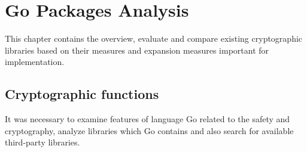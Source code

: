 \documentclass[
  digital, %
  notable,   %
  lof,     %
  lot,     %
]{fithesis3}
\begin{document}

\nocite{chisnall2012go}
\nocite{balbaert_2012}
\nocite{summerfield_2012}
\nocite{harris_2015}
\nocite{kozyra_2014}

\chapter{Go Packages Analysis}
This chapter contains the overview, evaluate and compare existing cryptographic libraries based on 
their measures and expansion measures important for implementation.

\section{Cryptographic functions}
It was necessary to examine features of language Go related to the safety and cryptography, analyze 
libraries which Go contains and also search for available third-party libraries. 
\end{document}
